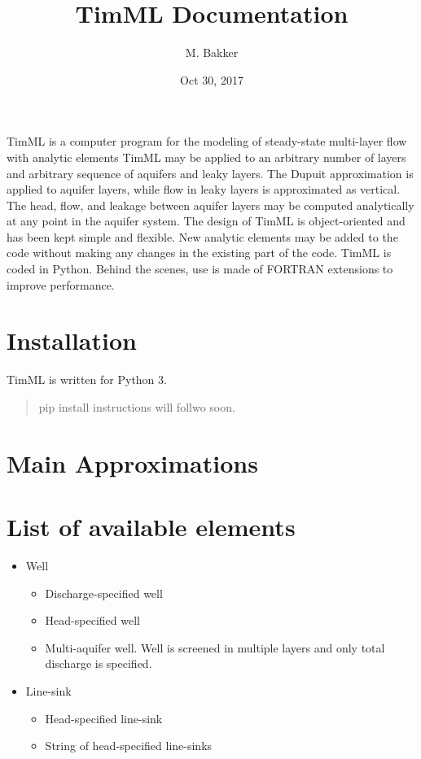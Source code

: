 \documentclass[letterpaper,10pt,english]{sphinxmanual}
\title{TimML Documentation}
\date{Oct 30, 2017}
\author{M. Bakker}
\begin{document}
\maketitle
\sphinxtableofcontents
{}\label{\detokenize{index::doc}}


TimML is a computer program for the modeling of steady-state multi-layer flow with analytic elements
TimML may be applied to an arbitrary number of layers and arbitrary sequence of aquifers and leaky layers.
The Dupuit approximation is applied to aquifer layers, while flow in leaky layers is approximated as vertical.
The head, flow, and leakage between aquifer layers may be computed analytically at any point in the aquifer system.
The design of TimML is object-oriented and has been kept simple and flexible.
New analytic elements may be added to the code without making any changes in the existing part of the code.
TimML is coded in Python. Behind the scenes, use is made of FORTRAN extensions to improve performance.


\chapter{Installation}
\label{\detokenize{index:installation}}\label{\detokenize{index:timml-this-documentation-is-under-construction}}
TimML is written for Python 3.
\begin{quote}

pip install instructions will follwo soon.
\end{quote}


\chapter{Main Approximations}
\label{\detokenize{index:main-approximations}}

\chapter{List of available elements}
\label{\detokenize{index:list-of-available-elements}}\begin{itemize}
\item {} 
Well
\begin{itemize}
\item {} 
Discharge-specified well

\item {} 
Head-specified well

\item {} 
Multi-aquifer well. Well is screened in multiple layers and only total discharge is specified.

\end{itemize}

\item {} 
Line-sink
\begin{itemize}
\item {} 
Head-specified line-sink

\item {} 
String of head-specified line-sinks

\end{itemize}

\end{itemize}
\end{document}
